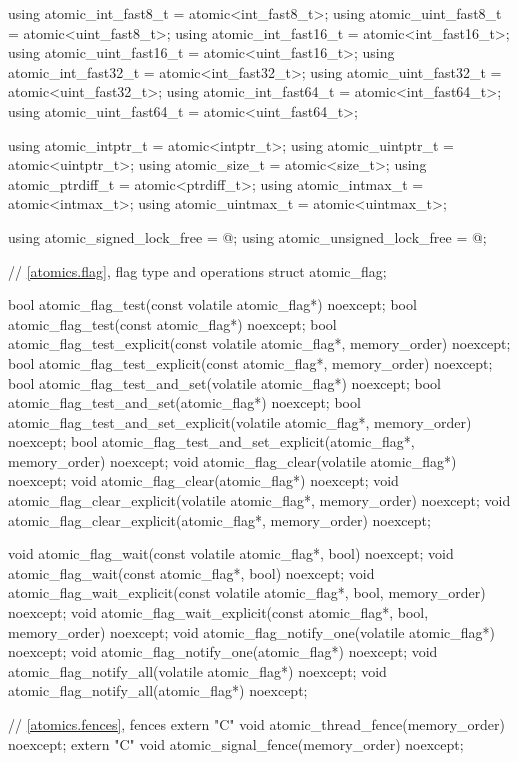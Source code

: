 \begin{codeblock}
{  using atomic_int_fast8_t    = atomic<int_fast8_t>;
  using atomic_uint_fast8_t   = atomic<uint_fast8_t>;
  using atomic_int_fast16_t   = atomic<int_fast16_t>;
  using atomic_uint_fast16_t  = atomic<uint_fast16_t>;
  using atomic_int_fast32_t   = atomic<int_fast32_t>;
  using atomic_uint_fast32_t  = atomic<uint_fast32_t>;
  using atomic_int_fast64_t   = atomic<int_fast64_t>;
  using atomic_uint_fast64_t  = atomic<uint_fast64_t>;

  using atomic_intptr_t       = atomic<intptr_t>;
  using atomic_uintptr_t      = atomic<uintptr_t>;
  using atomic_size_t         = atomic<size_t>;
  using atomic_ptrdiff_t      = atomic<ptrdiff_t>;
  using atomic_intmax_t       = atomic<intmax_t>;
  using atomic_uintmax_t      = atomic<uintmax_t>;

  using atomic_signed_lock_free   = @\seebelow@;
  using atomic_unsigned_lock_free = @\seebelow@;

  // \ref{atomics.flag}, flag type and operations
  struct atomic_flag;

  bool atomic_flag_test(const volatile atomic_flag*) noexcept;
  bool atomic_flag_test(const atomic_flag*) noexcept;
  bool atomic_flag_test_explicit(const volatile atomic_flag*, memory_order) noexcept;
  bool atomic_flag_test_explicit(const atomic_flag*, memory_order) noexcept;
  bool atomic_flag_test_and_set(volatile atomic_flag*) noexcept;
  bool atomic_flag_test_and_set(atomic_flag*) noexcept;
  bool atomic_flag_test_and_set_explicit(volatile atomic_flag*, memory_order) noexcept;
  bool atomic_flag_test_and_set_explicit(atomic_flag*, memory_order) noexcept;
  void atomic_flag_clear(volatile atomic_flag*) noexcept;
  void atomic_flag_clear(atomic_flag*) noexcept;
  void atomic_flag_clear_explicit(volatile atomic_flag*, memory_order) noexcept;
  void atomic_flag_clear_explicit(atomic_flag*, memory_order) noexcept;

  void atomic_flag_wait(const volatile atomic_flag*, bool) noexcept;
  void atomic_flag_wait(const atomic_flag*, bool) noexcept;
  void atomic_flag_wait_explicit(const volatile atomic_flag*,
                                 bool, memory_order) noexcept;
  void atomic_flag_wait_explicit(const atomic_flag*,
                                 bool, memory_order) noexcept;
  void atomic_flag_notify_one(volatile atomic_flag*) noexcept;
  void atomic_flag_notify_one(atomic_flag*) noexcept;
  void atomic_flag_notify_all(volatile atomic_flag*) noexcept;
  void atomic_flag_notify_all(atomic_flag*) noexcept;

  // \ref{atomics.fences}, fences
  extern "C" void atomic_thread_fence(memory_order) noexcept;
  extern "C" void atomic_signal_fence(memory_order) noexcept;
}
\end{codeblock}

